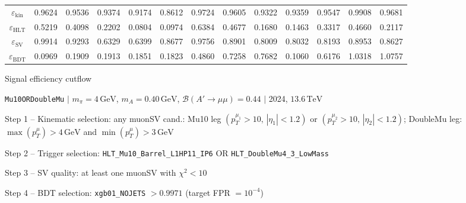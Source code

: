 \documentclass[10pt,a4paper]{article}
\begin{document}
\begin{landscape}
{\begin{tabular}{c|cccc|cccc|cccc}
\midrule
$\varepsilon_{\mathrm{kin}}$ & 0.9624 & 0.9536 & 0.9374 & 0.9174 & 0.8612 & 0.9724 & 0.9605 & 0.9322 & 0.9359 & 0.9547 & 0.9908 & 0.9681\\
$\varepsilon_{\mathrm{HLT}}$ & 0.5219 & 0.4098 & 0.2202 & 0.0804 & 0.0974 & 0.6384 & 0.4677 & 0.1680 & 0.1463 & 0.3317 & 0.4660 & 0.2117\\
$\varepsilon_{\mathrm{SV}}$ & 0.9914 & 0.9293 & 0.6329 & 0.6399 & 0.8677 & 0.9756 & 0.8901 & 0.8009 & 0.8032 & 0.8193 & 0.8953 & 0.8627\\
$\varepsilon_{\mathrm{BDT}}$ & 0.0969 & 0.1909 & 0.1913 & 0.1851 & 0.1823 & 0.4860 & 0.7258 & 0.7682 & 0.1060 & 0.6176 & 1.0318 & 1.0757\\
\bottomrule
\end{tabular}}

\end{landscape}
\clearpage

{\large Signal efficiency cutflow

 \texttt{Mu10ORDoubleMu} $|$ $m_{\pi}=4\,\mathrm{GeV}$, $m_{A}=0.40\,\mathrm{GeV}$, $\mathcal{B}(A'\!\to\!\mu\mu)=0.44$ $|$ 2024, $13.6\,\mathrm{TeV}$}

\vspace{0.8em}

Step 1 -- Kinematic selection: any muonSV cand.: Mu10 leg $(p_T^{\mu_1}{>}10,\,|\eta_1|{<}1.2)$ or $(p_T^{\mu_2}{>}10,\,|\eta_2|{<}1.2)$; DoubleMu leg: $\max(p_T^{\mu}){>}4\,\mathrm{GeV}$ and $\min(p_T^{\mu}){>}3\,\mathrm{GeV}$

Step 2 -- Trigger selection: \texttt{HLT\_Mu10\_Barrel\_L1HP11\_IP6} OR \texttt{HLT\_DoubleMu4\_3\_LowMass}

Step 3 -- SV quality: at least one muonSV with $\chi^2<10$

Step 4 -- BDT selection: \texttt{xgb01\_NOJETS} $>0.9971$ (target FPR $=10^{-4}$)

\vspace{0.8em}
\end{document}
